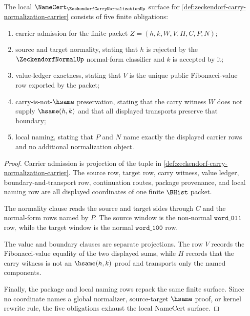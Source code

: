 \begin{theorem}
\label{thm:zeckendorf-carry-normalization-namecert-obligations}
The local $\NameCert_{\ZeckendorfCarryNormalizationUp}$ surface for
\autoref{def:zeckendorf-carry-normalization-carrier} consists of five
finite obligations:
\begin{enumerate}
\item carrier admission for the finite packet $Z=(h,k,W,V,H,C,P,N)$;
\item source and target normality, stating that $h$ is rejected by the
$\ZeckendorfNormalUp$ normal-form classifier and $k$ is accepted by it;
\item value-ledger exactness, stating that $V$ is the unique public
Fibonacci-value row exported by the packet;
\item carry-is-not-$\hsame$ preservation, stating that the carry witness $W$
does not supply $\hsame(h,k)$ and that all displayed transports preserve that
boundary;
\item local naming, stating that $P$ and $N$ name exactly the displayed
carrier rows and no additional normalization object.
\end{enumerate}
\end{theorem}
\begin{proof}
Carrier admission is projection of the tuple in
\autoref{def:zeckendorf-carry-normalization-carrier}. The source row, target
row, carry witness, value ledger, boundary-and-transport row, continuation
routes, package provenance, and local naming row are all displayed
coordinates of one finite $\BHist$ packet.

The normality clause reads the source and target sides through $C$ and the
normal-form rows named by $P$. The source window is the non-normal
$\mathtt{word\_011}$ row, while the target window is the normal
$\mathtt{word\_100}$ row.

The value and boundary clauses are separate projections. The row $V$ records
the Fibonacci-value equality of the two displayed sums, while $H$ records
that the carry witness is not an $\hsame(h,k)$ proof and transports only the
named components.

Finally, the package and local naming rows repack the same finite surface.
Since no coordinate names a global normalizer, source-target $\hsame$ proof,
or kernel rewrite rule, the five obligations exhaust the local NameCert
surface.
\end{proof}

